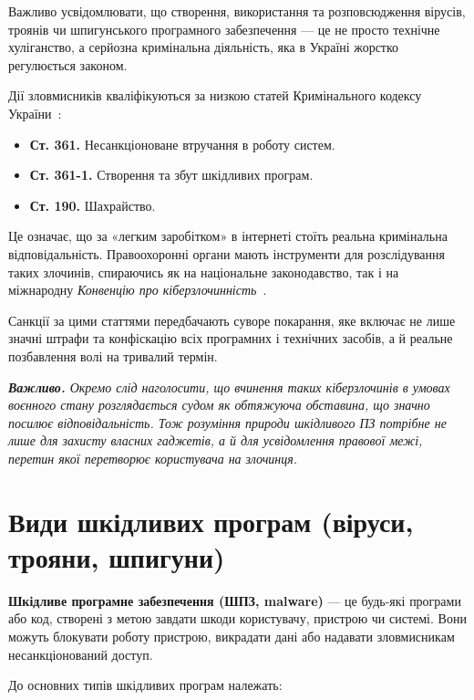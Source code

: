 Важливо усвідомлювати, що створення, використання та розповсюдження вірусів, троянів чи шпигунського програмного забезпечення — це не просто технічне хуліганство, а серйозна кримінальна діяльність, яка в Україні жорстко регулюється законом.

Дії зловмисників кваліфікуються за низкою статей Кримінального кодексу України~\cite{KKU2001}:
\begin{itemize}
    \item \textbf{Ст. 361.} Несанкціоноване втручання в роботу систем.
    \item \textbf{Ст. 361-1.} Створення та збут шкідливих програм.
    \item \textbf{Ст. 190.} Шахрайство.
\end{itemize}

Це означає, що за «легким заробітком» в інтернеті стоїть реальна кримінальна відповідальність. Правоохоронні органи мають інструменти для розслідування таких злочинів, спираючись як на національне законодавство, так і на міжнародну \textit{Конвенцію про кіберзлочинність}~\cite{Budapest_Convention_2001}.

Санкції за цими статтями передбачають суворе покарання, яке включає не лише значні штрафи та конфіскацію всіх програмних і технічних засобів, а й реальне позбавлення волі на тривалий термін.

\textit{\textbf{Важливо.} Окремо слід наголосити, що вчинення таких кіберзлочинів в умовах воєнного стану розглядається судом як обтяжуюча обставина, що значно посилює відповідальність. Тож розуміння природи шкідливого ПЗ потрібне не лише для захисту власних гаджетів, а й для усвідомлення правової межі, перетин якої перетворює користувача на злочинця.}

\section{Види шкідливих програм (віруси, трояни, шпигуни)}

\textbf{Шкідливе програмне забезпечення (ШПЗ, malware)} — це будь-які програми або код, створені з метою завдати шкоди користувачу, пристрою чи системі. Вони можуть блокувати роботу пристрою, викрадати дані або надавати зловмисникам несанкціонований доступ.

\vspace{0.3cm}

До основних типів шкідливих програм належать:

